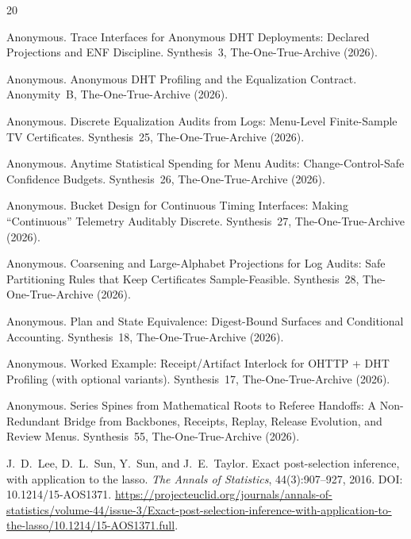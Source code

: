 \documentclass[11pt]{article}
\begin{document}

\begin{thebibliography}{20}

Anonymous.
\newblock Trace Interfaces for Anonymous DHT Deployments: Declared Projections and ENF Discipline.
\newblock Synthesis~3, The-One-True-Archive (2026).

Anonymous.
\newblock Anonymous DHT Profiling and the Equalization Contract.
\newblock Anonymity~B, The-One-True-Archive (2026).

Anonymous.
\newblock Discrete Equalization Audits from Logs: Menu-Level Finite-Sample TV Certificates.
\newblock Synthesis~25, The-One-True-Archive (2026).

Anonymous.
\newblock Anytime Statistical Spending for Menu Audits: Change-Control-Safe Confidence Budgets.
\newblock Synthesis~26, The-One-True-Archive (2026).

Anonymous.
\newblock Bucket Design for Continuous Timing Interfaces: Making ``Continuous'' Telemetry Auditably Discrete.
\newblock Synthesis~27, The-One-True-Archive (2026).

Anonymous.
\newblock Coarsening and Large-Alphabet Projections for Log Audits: Safe Partitioning Rules that Keep Certificates Sample-Feasible.
\newblock Synthesis~28, The-One-True-Archive (2026).

Anonymous.
\newblock Plan and State Equivalence: Digest-Bound Surfaces and Conditional Accounting.
\newblock Synthesis~18, The-One-True-Archive (2026).

Anonymous.
\newblock Worked Example: Receipt/Artifact Interlock for OHTTP + DHT Profiling (with optional variants).
\newblock Synthesis~17, The-One-True-Archive (2026).



Anonymous.
\newblock Series Spines from Mathematical Roots to Referee Handoffs: A Non-Redundant Bridge from Backbones, Receipts, Replay, Release Evolution, and Review Menus.
\newblock Synthesis~55, The-One-True-Archive (2026).

J.~D.~Lee, D.~L.~Sun, Y.~Sun, and J.~E.~Taylor.
\newblock Exact post-selection inference, with application to the lasso.
\newblock \emph{The Annals of Statistics}, 44(3):907--927, 2016.
\newblock DOI: 10.1214/15-AOS1371.
\newblock \url{https://projecteuclid.org/journals/annals-of-statistics/volume-44/issue-3/Exact-post-selection-inference-with-application-to-the-lasso/10.1214/15-AOS1371.full}.

\end{thebibliography}
\end{document}
